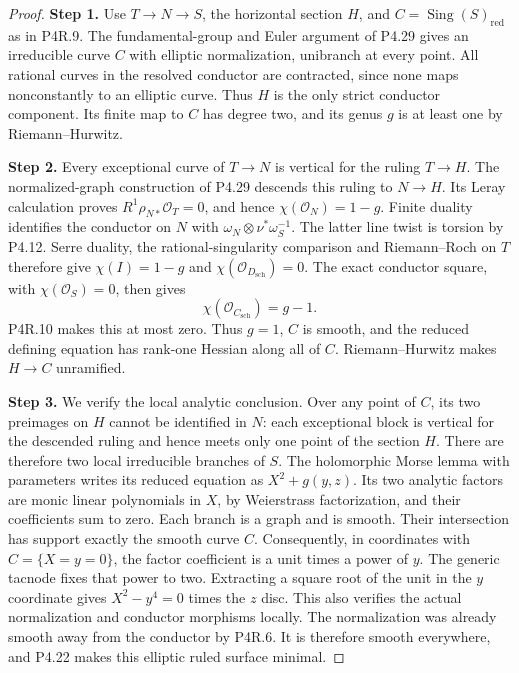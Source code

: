 \begin{proof}
\noindent\textbf{Step 1.} Use $T\to N\to S$, the horizontal section $H$, and
$C=\operatorname{Sing}(S)_{\mathrm{red}}$ as in P4R.9.
The fundamental-group and Euler argument of P4.29 gives an
irreducible curve $C$ with elliptic normalization, unibranch
at every point. All rational curves in the resolved conductor
are contracted, since none maps nonconstantly to an elliptic
curve. Thus $H$ is the only strict conductor component.
Its finite map to $C$ has degree two, and its genus $g$ is at
least one by Riemann--Hurwitz.

\noindent\textbf{Step 2.} Every exceptional curve of $T\to N$ is vertical for the ruling
$T\to H$. The normalized-graph construction of P4.29 descends
this ruling to $N\to H$. Its Leray calculation proves
$R^1\rho_{N*}\mathcal O_T=0$, and hence
$\chi(\mathcal O_N)=1-g$. Finite duality identifies the
conductor on $N$ with $\omega_N\otimes\nu^*\omega_S^{-1}$.
The latter line twist is torsion by P4.12. Serre duality,
the rational-singularity comparison and Riemann--Roch on $T$
therefore give $\chi(I)=1-g$ and
$\chi(\mathcal O_{D_{\mathrm{sch}}})=0$.
The exact conductor square, with $\chi(\mathcal O_S)=0$,
then gives
\[
 \chi(\mathcal O_{C_{\mathrm{sch}}})=g-1.
\]
P4R.10 makes this at most zero. Thus $g=1$, $C$ is smooth,
and the reduced defining equation has rank-one Hessian along
all of $C$. Riemann--Hurwitz makes $H\to C$ unramified.

\noindent\textbf{Step 3.} We verify the local analytic conclusion. Over any point of
$C$, its two preimages on $H$ cannot be identified in $N$:
each exceptional block is vertical for the descended ruling
and hence meets only one point of the section $H$.
There are therefore two local irreducible branches of $S$.
The holomorphic Morse lemma with parameters writes its reduced
equation as $X^2+g(y,z)$. Its two analytic factors are monic
linear polynomials in $X$, by Weierstrass factorization, and
their coefficients sum to zero. Each branch is a graph and
is smooth. Their intersection has support exactly the smooth
curve $C$. Consequently, in coordinates with $C=\{X=y=0\}$,
the factor coefficient is a unit times a power of $y$.
The generic tacnode fixes that power to two. Extracting a square
root of the unit in the $y$ coordinate gives
$X^2-y^4=0$ times the $z$ disc. This also verifies the actual
normalization and conductor morphisms locally.
The normalization was already smooth away from the conductor
by P4R.6. It is therefore smooth everywhere, and P4.22 makes
this elliptic ruled surface minimal.
\end{proof}

